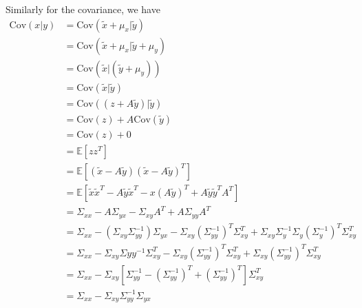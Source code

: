 Similarly for the covariance, we have
\begin{align}
    \text{Cov}(x \vert y) &= \text{Cov}(\tilde{x}+\mu_x \vert \tilde{y}) \\
    &= \text{Cov}(\tilde{x}+\mu_x \vert \tilde{y} + \mu_y) \\
    &= \text{Cov}(\tilde{x}\vert(\tilde{y}+\mu_y)) \\
    &= \text{Cov}(\tilde{x}\vert \tilde{y}) \\
    &= \text{Cov}((z+A\tilde{y})\vert\tilde{y}) \\
    &= \text{Cov}(z) + {A\text{Cov}(\tilde{y})} \\
    &= \text{Cov}(z) + 0 \\
    &= \mathbb{E}[zz^T] \\
    &= \mathbb{E}[(\tilde{x}-A\tilde{y})(\tilde{x}-A\tilde{y})^T]\\
    &= \mathbb{E}[\tilde{x}\tilde{x}^T - A\tilde{y}\tilde{x}^T -x(A\tilde{y})^T + A\tilde{y}\tilde{y}^TA^T] \\
    &= \Sigma_{xx} - A\Sigma_{yx} - \Sigma_{xy}A^T + A\Sigma_{yy}A^T \\
    &= \Sigma_{xx}-(\Sigma_{xy}\Sigma_{yy}^{-1})\Sigma_{yx} - \Sigma_{xy}(\Sigma_{yy}^{-1})^T\Sigma_{xy}^T + \Sigma_{xy}\Sigma_y^{-1}\Sigma_{y}(\Sigma_{y}^{-1})^T\Sigma_{xy}^T \\
    &= \Sigma_{xx} - \Sigma_{xy}\Sigma{yy}^{-1}\Sigma_{xy}^T - \Sigma_{xy}(\Sigma_{yy}^{-1})^T\Sigma_{xy}^T + \Sigma_{xy}(\Sigma_{yy}^{-1})^T\Sigma_{xy}^T \\
    &= \Sigma_{xx}-\Sigma_{xy}\left[\Sigma_{yy}^{-1} - (\Sigma_{yy}^{-1})^T + (\Sigma_{yy}^{-1})^T \right]\Sigma_{xy}^T \\
    &= \Sigma_{xx} - \Sigma_{xy}\Sigma_{yy}^{-1}\Sigma_{yx}
\end{align}

